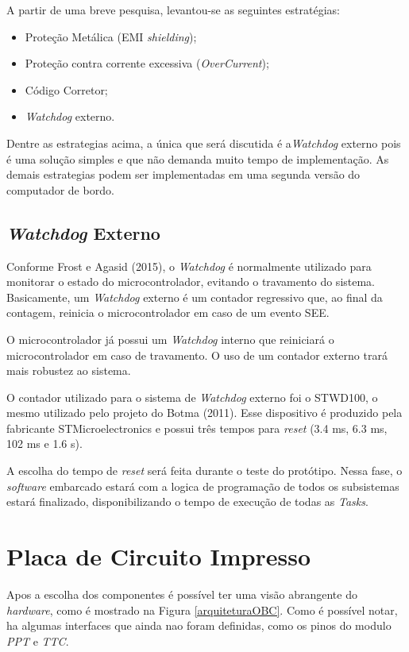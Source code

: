 A partir de uma breve pesquisa, levantou-se as seguintes estratégias:
\begin{itemize}
	\item Proteção Metálica (EMI \textit{shielding});
	\item Proteção contra corrente excessiva (\textit{OverCurrent});
	\item Código Corretor;
	\item \textit{Watchdog} externo.
\end{itemize}

Dentre as estrategias acima, a única que será discutida é a\textit{Watchdog} externo pois é uma solução simples e que não demanda muito tempo de implementação. As demais estrategias podem ser implementadas em uma segunda versão do computador de bordo.

\subsection{\textit{Watchdog} Externo}

Conforme  Frost e Agasid (2015), o \textit{Watchdog}  é normalmente utilizado para monitorar o estado do microcontrolador, evitando o travamento do sistema. Basicamente, um \textit{Watchdog} externo é um contador regressivo que, ao final da contagem, reinicia o microcontrolador em caso de um evento SEE. 

O microcontrolador já possui um \textit{Watchdog} interno que reiniciará o microcontrolador em caso de travamento. O uso de um contador externo trará mais robustez ao sistema.

O contador utilizado para o sistema de \textit{Watchdog} externo foi o STWD100, o mesmo utilizado pelo projeto do Botma (2011). Esse dispositivo é produzido pela fabricante STMicroelectronics e possui três tempos para \textit{reset} (3.4 ms, 6.3 ms, 102 ms e 1.6 s).  

A escolha do tempo de \textit{reset} será feita durante o teste do protótipo. Nessa fase, o \textit{software} embarcado estará com a logica de programação de todos os subsistemas estará finalizado, disponibilizando o tempo de execução de todas as \textit{Tasks}.

\section{Placa de Circuito Impresso}

Apos a escolha dos componentes é possível ter uma visão abrangente do \textit{hardware}, como é mostrado na Figura \ref{arquiteturaOBC}. Como é possível notar, ha algumas interfaces que ainda nao foram definidas, como os pinos do modulo \textit{PPT} e \textit{TTC}.


